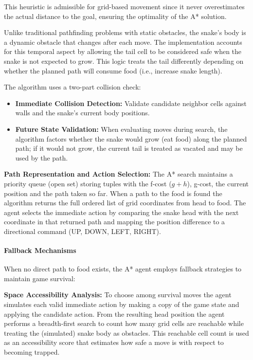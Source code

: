\documentclass[a4paper,12pt]{article}
\begin{document}
This heuristic is admissible for grid-based movement since it never overestimates the actual distance to the goal, ensuring the optimality of the A* solution.

Unlike traditional pathfinding problems with static obstacles, the snake's body is a dynamic obstacle that changes after each move. The implementation accounts for this temporal aspect by allowing the tail cell to be considered safe when the snake is not expected to grow. This logic treats the tail differently depending on whether the planned path will consume food (i.e., increase snake length).

The algorithm uses a two-part collision check:
\begin{itemize}
   \item \textbf{Immediate Collision Detection:} Validate candidate neighbor cells against walls and the snake's current body positions.
   \item \textbf{Future State Validation:} When evaluating moves during search, the algorithm factors whether the snake would grow (eat food) along the planned path; if it would not grow, the current tail is treated as vacated and may be used by the path.
\end{itemize}

	\textbf{Path Representation and Action Selection:} The A* search maintains a priority queue (open set) storing tuples with the f-cost (\(g+h\)), g-cost, the current position and the path taken so far. When a path to the food is found the algorithm returns the full ordered list of grid coordinates from head to food. The agent selects the immediate action by comparing the snake head with the next coordinate in that returned path and mapping the position difference to a directional command (UP, DOWN, LEFT, RIGHT).

\paragraph{Fallback Mechanisms}

When no direct path to food exists, the A* agent employs fallback strategies to maintain game survival:

	\textbf{Space Accessibility Analysis:} To choose among survival moves the agent simulates each valid immediate action by making a copy of the game state and applying the candidate action. From the resulting head position the agent performs a breadth-first search to count how many grid cells are reachable while treating the (simulated) snake body as obstacles. This reachable cell count is used as an accessibility score that estimates how safe a move is with respect to becoming trapped.
\end{document}
